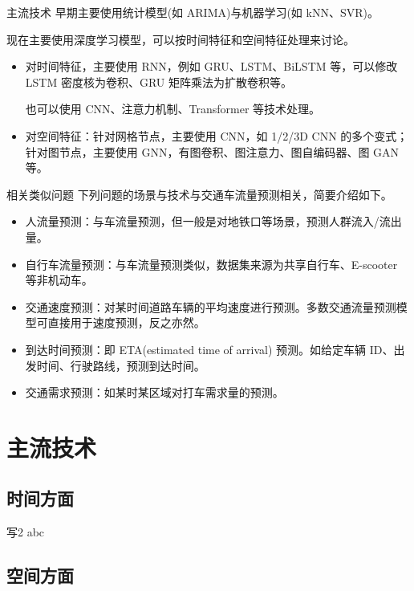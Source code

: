 \documentclass{libs/format}
\begin{document}
\begin{frame}{主流技术}
  早期主要使用统计模型(如 ARIMA)与机器学习(如 kNN、SVR)。\cite{T-ZS1}

  现在主要使用深度学习模型，可以按时间特征和空间特征处理来讨论。
  \begin{itemize}
    \item 对时间特征，主要使用 RNN，例如 GRU、LSTM、BiLSTM 等，可以修改 LSTM 密度核为卷积、GRU 矩阵乘法为扩散卷积等。
    
    也可以使用 CNN、注意力机制、Transformer 等技术处理。
    \item 对空间特征：针对网格节点，主要使用 CNN，如 1/2/3D CNN 的多个变式；针对图节点，主要使用 GNN，有图卷积、图注意力、图自编码器、图 GAN 等。
  \end{itemize}
\end{frame}

\begin{frame}{相关类似问题}
  下列问题的场景与技术与交通车流量预测相关，简要介绍如下。
  \begin{itemize}
    \item 人流量预测：与车流量预测，但一般是对地铁口等场景，预测人群流入/流出量。\cite{T-ZS44}
    \item 自行车流量预测：与车流量预测类似，数据集来源为共享自行车\cite{T-162}、E-scooter\cite{T-286} 等非机动车。
    \item 交通速度预测：对某时间道路车辆的平均速度进行预测。多数交通流量预测模型可直接用于速度预测，反之亦然。
    \item 到达时间预测：即 ETA(estimated time of arrival) 预测。如给定车辆 ID、出发时间、行驶路线，预测到达时间。\cite{T-316}
    \item 交通需求预测：如某时某区域对打车需求量的预测。
  \end{itemize}
\end{frame}

\section{主流技术}

\subsection{时间方面}

\begin{frame}{写2}
  abc
\end{frame}

\subsection{空间方面}
\end{document}
